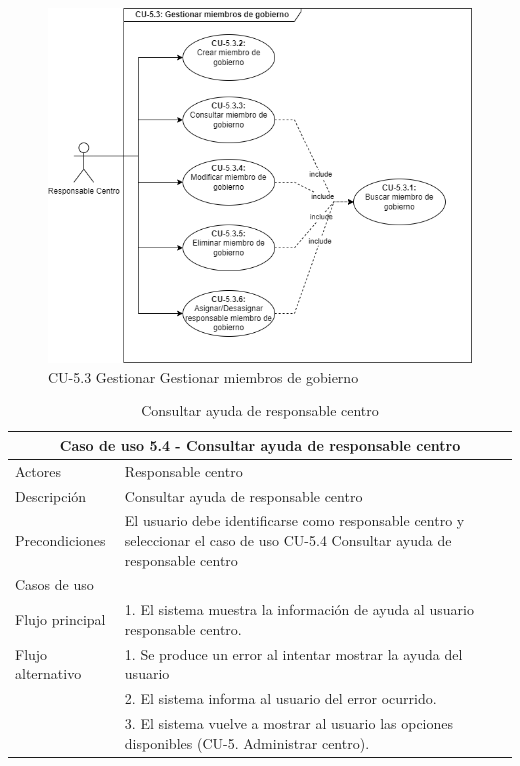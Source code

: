 \begin{figure}[H]
        \centering
        \includegraphics[scale=0.55]{img/diagramas/Funcional/CU-5.3.png}
        \caption{CU-5.3 Gestionar Gestionar miembros de gobierno}
        \label{fig:Diagrama-Caso de uso 5.3 Gestionar miembros de gobierno}
    \end{figure}


\begin{table}[H]
    \caption{Consultar ayuda de responsable centro}
    \label{tab:CU-5.4}
    \begin{center}
        \begin{tabular}{|l|p{12cm}|}
            \hline
            \multicolumn{2}{|c|}{Caso de uso 5.4 - Consultar ayuda de responsable centro} \\ \hline 
            Actores                 &   Responsable centro          \\  
            \hline
            Descripción        & Consultar ayuda de responsable centro    \\ \hline 
            Precondiciones          &   El usuario debe identificarse  como responsable centro y seleccionar el caso de uso CU-5.4 Consultar ayuda de responsable centro         \\  \hline
            Casos de uso            &          \\ \hline
            Flujo principal         &   1. El sistema muestra la información de ayuda 
            al usuario responsable centro.     \\\hline
            Flujo alternativo    &   1. Se produce un error al intentar mostrar la ayuda del usuario \\ 
            & 2. El sistema informa al usuario del error ocurrido. \\ 
            & 3. El sistema vuelve a mostrar al usuario las opciones disponibles (CU-5. Administrar centro).\\  \hline
        \end{tabular}
    \end{center}
\end{table}

